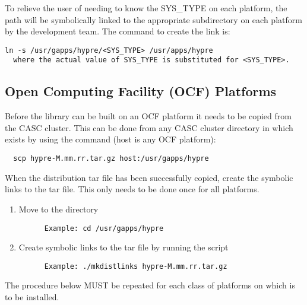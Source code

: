 To relieve the user of needing to know the SYS\_TYPE on each platform, the path
 will be symbolically linked to the appropriate subdirectory
on each platform by the development team.  The command to create the link is:
\begin{verbatim}
ln -s /usr/gapps/hypre/<SYS_TYPE> /usr/apps/hypre
  where the actual value of SYS_TYPE is substituted for <SYS_TYPE>.
\end{verbatim}

\subsection{Open Computing Facility (OCF) Platforms}
\label{Open Computing Facility (OCF) Platforms}

Before the \hypre{} library can be built on an OCF platform it needs to be 
copied from the CASC cluster.  This can be done from any CASC cluster directory
in which  exists by using the command (host is any OCF
platform):
\begin{verbatim}
  scp hypre-M.mm.rr.tar.gz host:/usr/gapps/hypre
\end{verbatim}

When the distribution tar file has been successfully copied, create the symbolic
links to the tar file. This only needs to be done once for all platforms.

\begin{enumerate}
\item Move to the  directory
\begin{verbatim}
      Example: cd /usr/gapps/hypre
\end{verbatim}
\item Create symbolic links to the tar file by running the  script
\begin{verbatim}
      Example: ./mkdistlinks hypre-M.mm.rr.tar.gz
\end{verbatim}
\end{enumerate}

The procedure below MUST be repeated for each class of platforms on which \hypre{} is 
to be installed. 

